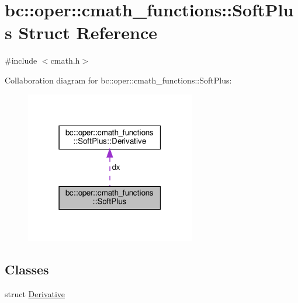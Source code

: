 \hypertarget{structbc_1_1oper_1_1cmath__functions_1_1SoftPlus}{}\section{bc\+:\+:oper\+:\+:cmath\+\_\+functions\+:\+:Soft\+Plus Struct Reference}
\label{structbc_1_1oper_1_1cmath__functions_1_1SoftPlus}


{\ttfamily \#include $<$cmath.\+h$>$}



Collaboration diagram for bc\+:\+:oper\+:\+:cmath\+\_\+functions\+:\+:Soft\+Plus\+:\nopagebreak
\begin{figure}[H]
\begin{center}
\leavevmode
\includegraphics[width=210pt]{structbc_1_1oper_1_1cmath__functions_1_1SoftPlus__coll__graph}
\end{center}
\end{figure}
\subsection*{Classes}
\begin{DoxyCompactItemize}
\item 
struct \hyperlink{structbc_1_1oper_1_1cmath__functions_1_1SoftPlus_1_1Derivative}{Derivative}
\end{DoxyCompactItemize}
